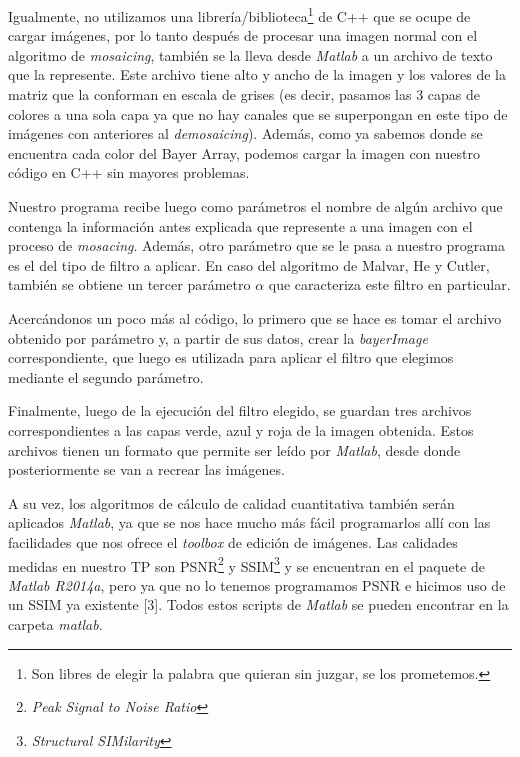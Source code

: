 Igualmente, no utilizamos una librería/biblioteca\footnote{Son libres de elegir la palabra que quieran sin juzgar, se los prometemos.} de C++ que se ocupe de cargar imágenes, por lo tanto después de procesar una imagen normal con el algoritmo de \textit{mosaicing}, también se la lleva desde \textit{Matlab} a un archivo de texto que la represente. Este archivo tiene alto y ancho de la imagen y los valores de la matriz que la conforman en escala de grises (es decir, pasamos las 3 capas de colores a una sola capa ya que no hay canales que se superpongan en este tipo de imágenes con anteriores al \textit{demosaicing}). Además, como ya sabemos donde se encuentra cada color del Bayer Array, podemos cargar la imagen con nuestro código en C++ sin mayores problemas.

Nuestro programa recibe luego como parámetros el nombre de algún archivo que contenga la información antes explicada que represente a una imagen con el proceso de \textit{mosacing}. Además, otro parámetro que se le pasa a nuestro programa es el del tipo de filtro a aplicar. En caso del algoritmo de Malvar, He y Cutler, también se obtiene un tercer parámetro \textbf{$\alpha$} que caracteriza este filtro en particular.

Acercándonos un poco más al código, lo primero que se hace es tomar el archivo obtenido por parámetro y, a partir de sus datos, crear la \textit{bayerImage} correspondiente, que luego es utilizada para aplicar el filtro que elegimos mediante el segundo parámetro.

Finalmente, luego de la ejecución del filtro elegido, se guardan tres archivos correspondientes a las capas verde, azul y roja de la imagen obtenida. Estos archivos tienen un formato que permite ser leído por \textit{Matlab}, desde donde posteriormente se van a recrear las imágenes.

A su vez, los algoritmos de cálculo de calidad cuantitativa también serán aplicados \textit{Matlab}, ya que se nos hace mucho más fácil programarlos allí con las facilidades que nos ofrece el \textit{toolbox} de edición de imágenes. Las calidades medidas en nuestro TP son PSNR\footnote{\textit{Peak Signal to Noise Ratio}} y SSIM\footnote{\textit{Structural SIMilarity}} y se encuentran en el paquete de \textit{Matlab R2014a}, pero ya que no lo tenemos programamos PSNR e hicimos uso de un SSIM ya existente [3]. Todos estos scripts de \textit{Matlab} se pueden encontrar en la carpeta \textit{matlab}.

\vspace{2\baselineskip}

